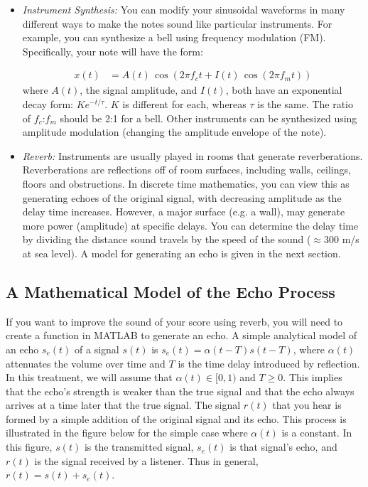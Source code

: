 \documentclass[12pt]{article}
\begin{document}
\begin{itemize}
\item \textit{Instrument Synthesis:} You can modify your sinusoidal waveforms in many different ways to make the notes sound like particular instruments. For example, you can synthesize a bell using frequency modulation (FM). Specifically, your note will have the form:

\vspace{-.5in}
\large
\begin{align*}
    x(t)&=A(t)\,\cos\left(2\pi f_ct+I(t)\,\cos\left(2\pi f_mt\right)\right)
\end{align*}
\normalsize
where $A(t)$, the signal amplitude, and $I(t)$, both have an exponential decay form: $Ke^{-t/\tau}$.  $K$ is different for each, whereas $\tau$ is the same. The ratio of $f_c$:$f_m$ should be 2:1 for a bell. Other instruments can be synthesized using amplitude modulation (changing the amplitude envelope of the note). 

\item \textit{Reverb:} Instruments are usually played in rooms that generate reverberations. Reverberations are reflections off of room surfaces, including walls, ceilings, floors and obstructions. In discrete time mathematics, you can view this as generating echoes of the original signal, with decreasing amplitude as the delay time increases. However, a major surface (e.g. a wall), may generate more power (amplitude) at specific delays. You can determine the delay time by dividing the distance sound travels by the speed of the sound ($\approx$300 m/s at sea level). A model for generating an echo is given in the next section.
\end{itemize}

\subsection{A Mathematical Model of the Echo Process}
If you want to improve the sound of your score using reverb, you will need to create a function in MATLAB to generate an echo. A simple analytical model of an echo $s_e(t)$ of a signal $s(t)$ is $s_e(t)=\alpha(t-T)s(t-T)$, where $\alpha(t)$ attenuates the volume over time and $T$ is the time delay introduced by reflection. In this treatment, we will assume that $\alpha(t)\in [0, 1)$ and $T\geq 0$. This implies that the echo’s strength is weaker than the true signal and that the echo always arrives at a time later that the true signal.  The signal $r(t)$ that you hear is formed by a simple addition of the original signal and its echo. This process is illustrated in the figure below for the simple case where $\alpha(t)$ is a constant. In this figure, $s(t)$ is the transmitted signal, $s_e(t)$ is that signal’s echo, and $r(t)$ is the signal received by a listener. Thus in general, $r(t)=s(t)+s_e(t)$.
\end{document}
